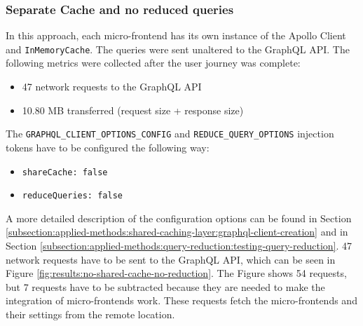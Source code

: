 \subsubsection{Separate Cache and no reduced queries}\label{subsubsection:results:performance-measurement:separate-cache-no-reduction}

In this approach, each micro-frontend has its own instance of the Apollo Client and \texttt{InMemoryCache}. The queries were sent unaltered to the GraphQL \ac{API}. The following metrics were collected after the user journey was complete:

\begin{itemize}
  \item 47 network requests to the GraphQL \ac{API}
  \item 10.80 MB transferred (request size + response size)
\end{itemize}

\noindent The \texttt{GRAPHQL\_CLIENT\_OPTIONS\_CONFIG} and \texttt{REDUCE\_QUERY\_OPTIONS} injection tokens have to be configured the following way:

\begin{itemize}
  \item \texttt{shareCache: false}
  \item \texttt{reduceQueries: false}
\end{itemize}

\noindent A more detailed description of the configuration options can be found in Section \ref{subsection:applied-methods:shared-caching-layer:graphql-client-creation} and in Section \ref{subsection:applied-methods:query-reduction:testing-query-reduction}. 47 network requests have to be sent to the GraphQL \ac{API}, which can be seen in Figure \ref{fig:results:no-shared-cache-no-reduction}. The Figure shows 54 requests, but 7 requests have to be subtracted because they are needed to make the integration of micro-frontends work. These requests fetch the micro-frontends and their settings from the remote location.

